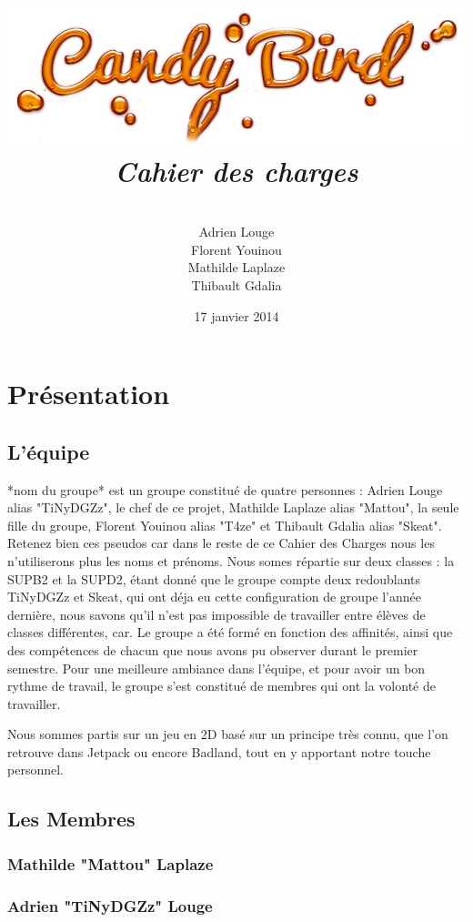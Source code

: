 \documentclass [11pt]{report}
\title{
	\includegraphics[scale=0.43]{images/entete.jpg}
	 \\\vspace{20mm}
	\textbf{\Huge \itshape Cahier des charges }
	}
\author{ \\\vspace{2mm}
	Adrien Louge \\\vspace{2mm}
	Florent Youinou\\\vspace{2mm}
	Mathilde Laplaze\\\vspace{2mm}
	Thibault Gdalia\\\vspace{30mm}
	}
\date{17 janvier 2014}
\begin{document}
\renewcommand{\baselinestretch}{0.001}
\maketitle
\tableofcontents

\newpage
\chapter {Pr\'esentation}

	\section{ L'\'equipe }

		*nom du groupe* est  un groupe constitué de quatre personnes : Adrien Louge alias "TiNyDGZz", le chef de ce projet, Mathilde Laplaze alias "Mattou", la seule fille du groupe, Florent Youinou alias "T4ze" et Thibault Gdalia alias "Skeat". Retenez bien ces pseudos car dans le reste de ce Cahier des Charges nous les n'utiliserons plus les noms et pr\'enoms. Nous somes r\'epartie sur deux classes : la SUPB2 et la SUPD2,  étant donné que le groupe compte deux redoublants TiNyDGZz et Skeat, qui ont d\'eja eu cette configuration de groupe l'ann\'ee derni\`ere, nous savons qu'il n'est pas impossible de travailler entre \'el\`eves de classes diff\'erentes, car. Le groupe a \'et\'e form\'e en fonction des affinit\'es, ainsi que des comp\'etences de chacun que nous avons pu observer durant le premier semestre. Pour une meilleure ambiance dans l'\'equipe, et pour avoir un bon rythme de travail, le groupe s'est constitué de membres qui ont la volont\'e de travailler. 
	
	Nous sommes partis sur un jeu en 2D bas\'e sur un principe tr\`es connu, que l'on retrouve dans Jetpack ou encore Badland, tout en y apportant notre touche personnel.
	
	\newpage

	\section { Les Membres }
		\subsection {Mathilde "Mattou" Laplaze}
	
		
		\newpage

		\subsection {Adrien "TiNyDGZz" Louge}
	
\end{document}
